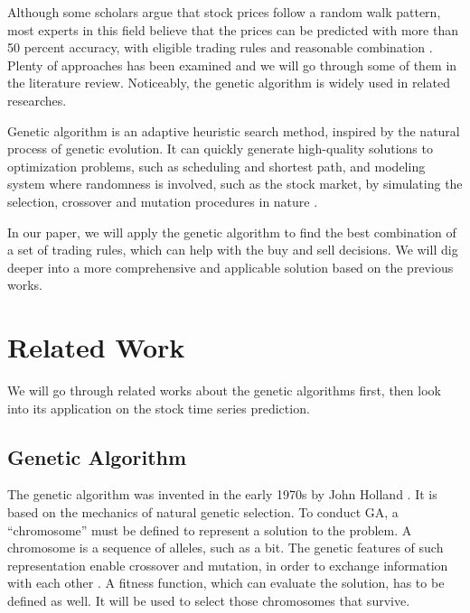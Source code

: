 \documentclass{article}
\begin{document}
Although some scholars argue that stock prices follow a random walk pattern,
most experts in this field believe that the prices can be predicted with more than 50 percent accuracy,
with eligible trading rules and reasonable combination \cite{stock-market-prediction-with-multiple-classifiers}.
Plenty of approaches has been examined and we will go through some of them in the literature review.
Noticeably, the genetic algorithm is widely used in related researches.

Genetic algorithm is an adaptive heuristic search method,
inspired by the natural process of genetic evolution.
It can quickly generate high-quality solutions to optimization problems, such as scheduling and shortest path,
and modeling system where randomness is involved, such as the stock market,
by simulating the selection, crossover and mutation procedures in nature
\cite{genetic-algorithm-review-and-application}.

In our paper, we will apply the genetic algorithm to
find the best combination of a set of trading rules, which can help with the buy and sell decisions.
We will dig deeper into a more comprehensive and applicable solution based on the previous works.

\section{Related Work}

We will go through related works about the genetic algorithms first,
then look into its application on the stock time series prediction.

\subsection{Genetic Algorithm}

The genetic algorithm was invented in the early 1970s by John Holland \cite{genetic-algorithm-review-and-application}.
It is based on the mechanics of natural genetic selection.
To conduct GA, a ``chromosome'' must be defined to represent a solution to the problem.
A chromosome is a sequence of alleles, such as a bit.
The genetic features of such representation enable crossover and mutation,
in order to exchange information with each other \cite{an-object-oriented-environment-for-specification}.
A fitness function, which can evaluate the solution, has to be defined as well.
It will be used to select those chromosomes that survive.
\end{document}
